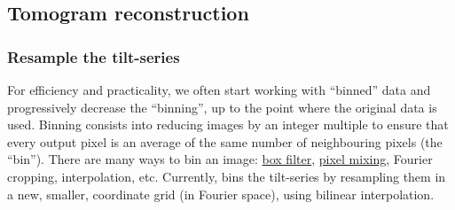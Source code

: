 \subsection{Tomogram reconstruction} \label{sec:algo:ctf_3d}




\subsubsection{Resample the tilt-series} \label{sec:algo:ctf_3d:resample}

For efficiency and practicality, we often start working with ``binned'' data and progressively decrease the ``binning'', up to the point where the original data is used. Binning consists into reducing images by an integer multiple to ensure that every output pixel is an average of the same number of neighbouring pixels (the ``bin''). There are many ways to bin an image: \href{https://www.imagemagick.org/Usage/filter/#box}{box filter}, \href{https://entropymine.com/imageworsener/pixelmixing/}{pixel mixing}, Fourier cropping, interpolation, etc. Currently, {\emClarity} bins the tilt-series by resampling them in a new, smaller, coordinate grid (in Fourier space), using bilinear interpolation.

